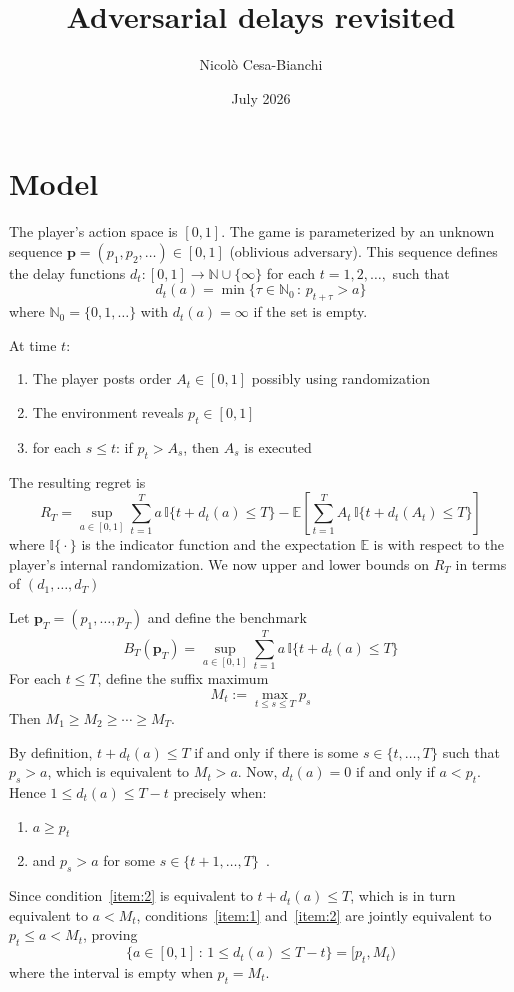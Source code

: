 \documentclass{article}
\title{Adversarial delays revisited}
\author{Nicolò Cesa-Bianchi}
\date{July 2026}
\newcommand{\Nat}{\mathbb{N}}
\newcommand{\E}{\mathbb{E}}
\newcommand{\Ind}[1]{\mathbb{I}\big\{{#1}\big\}}
\newcommand{\bp}{\boldsymbol{p}}
\begin{document}
\maketitle

\section{Model}
%
The player's action space is $[0,1]$. The game is parameterized by an unknown sequence $\bp = (p_1,p_2,\ldots) \in [0,1]$ (oblivious adversary). This sequence defines the delay functions $d_t : [0,1] \to \Nat\cup\{\infty\}$ for each $t=1,2,\ldots,$ such that
\[
    d_t(a) = \min\big\{\tau\in\Nat_0 \,:\, p_{t+\tau} > a\big\}
\]
where $\Nat_0 = \{0,1,\ldots\}$ with $d_t(a) = \infty$ if the set is empty.

At time $t$:
\begin{enumerate}
    \item The player posts order $A_t \in [0,1]$ possibly using randomization
    \item The environment reveals $p_t \in [0,1]$
    \item for each $s \le t$: if $p_t > A_s$, then $A_s$ is executed
\end{enumerate}
The resulting regret is
\[
    R_T = \sup_{a \in [0,1]} \sum_{t=1}^T a\,\Ind{t + d_t(a) \le T} - \E\left[\sum_{t=1}^T A_t\,\Ind{t + d_t(A_t) \le T}\right]
\]
where $\Ind{\cdot}$ is the indicator function and the expectation $\E$ is with respect to the player's internal randomization.
We now upper and lower bounds on $R_T$ in terms of $(d_1,\ldots,d_T)$

Let $\bp_T = (p_1,\ldots,p_T)$ and define the benchmark
\begin{equation}
\label{eq:benchmark-def}
    B_T(\bp_T)
=
    \sup_{a\in[0,1]} \sum_{t=1}^T a\,\Ind{t+d_t(a)\le T}
\end{equation}
For each $t\le T$, define the suffix maximum
\begin{equation}\label{eq:M-def}
    M_t:=\max_{t\le s\le T}p_s
\end{equation}
Then $M_1\ge M_2\ge\cdots\ge M_T$.

By definition, $t+d_t(a)\le T$ if and only if there is some $s\in\{t,\ldots,T\}$ such that $p_s>a$, which is equivalent to $M_t > a$. Now, $d_t(a)=0$ if and only if $a<p_t$.  Hence $1 \le d_t(a) \le T-t$ precisely when:
\begin{enumerate}
    \item \label{item:1} $a\ge p_t$
    \item \label{item:2} and $p_s > a$ for some $s\in\{t+1,\ldots,T\}$~.
\end{enumerate}
Since condition~\eqref{item:2} is equivalent to $t+d_t(a)\le T$, which is in turn equivalent to $a < M_t$, conditions~\eqref{item:1} and~\eqref{item:2} are jointly equivalent to $p_t\le a<M_t$, proving
\begin{equation}
\label{eq:useful}
    \big\{a\in[0,1] \,:\, 1\le d_t(a)\le T-t\big\} = [p_t,M_t)
\end{equation}
where the interval is empty when $p_t=M_t$.
\end{document}
